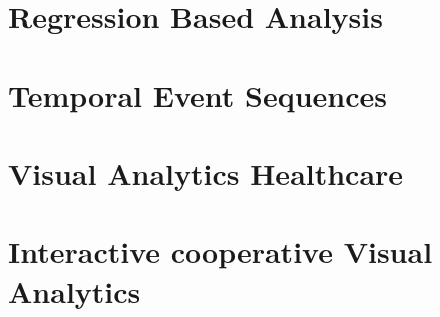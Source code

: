 \documentclass[11pt,ngerman]{article}
\begin{document}

\section{Regression Based Analysis}


\section{Temporal Event Sequences}


\section{Visual Analytics Healthcare}


\section{Interactive cooperative Visual Analytics}
\end{document}
